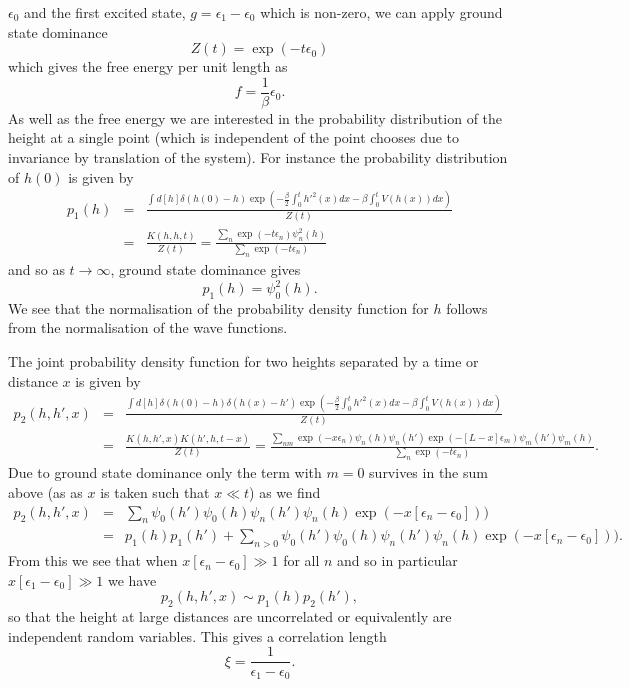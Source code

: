 $\epsilon_0$ and the first excited state, $g=\epsilon_1-\epsilon_0$ which is non-zero, we can apply ground state dominance 
\begin{equation}
Z(t) =\exp(-t\epsilon_0)
\end{equation}
which gives the free energy per unit length as
\begin{equation}
f=\frac{1}{\beta}\epsilon_0.
\end{equation}
As well as the free energy we are interested in the probability distribution of the height at a single point (which is independent of the point chooses due to invariance by translation of the system). For instance the probability distribution of $h(0)$ is given by
\begin{eqnarray}
p_1(h)&=& \frac{\int d[h]\delta(h(0)-h)\exp\left(-\frac{\beta}{2}\int_0^t h'^2(x) dx -\beta\int_0^t  V(h(x)) dx\right)}{Z(t)}\\
&=& \frac{K(h,h,t)}{Z(t)}=\frac{\sum_n \exp(-t\epsilon_n)\psi_n^2(h)}{\sum_n \exp(-t\epsilon_n)}
\end{eqnarray}
and so as $t\to\infty$, ground state dominance gives
\begin{equation}
p_1(h)= \psi_0^2(h).
\end{equation}
We see that the normalisation of the probability density function for $h$ follows from the 
normalisation of the wave functions.

The joint probability density function for two heights separated by a time or distance $x$ is given by
\begin{eqnarray}
p_2(h,h',x)&=& \frac{\int d[h]\delta(h(0)-h)\delta(h(x)-h')\exp\left(-\frac{\beta}{2}\int_0^t h'^2(x) dx -\beta\int_0^t  V(h(x)) dx\right)}{Z(t)}\\
&=& \frac{K(h,h',x)K(h',h,t-x)}{Z(t)} = \frac{\sum_{nm} \exp(-x\epsilon_n)\psi_n(h)\psi_n(h')\exp(-[L-x]\epsilon_m)\psi_m(h')\psi_m(h)}{\sum_n \exp(-t\epsilon_n)}.
\end{eqnarray}
Due to ground state dominance only the term with $m=0$ survives in the sum above (as
as $x$ is taken such that $x\ll t$) as we find
\begin{eqnarray}
p_2(h,h',x) &=& \sum_{n} \psi_0(h')\psi_0(h)\psi_n(h')\psi_n(h)\exp(-x[\epsilon_n-\epsilon_0]))\\
&=& p_1(h)p_1(h') + \sum_{n>0} \psi_0(h')\psi_0(h)\psi_n(h')\psi_n(h)\exp(-x[\epsilon_n-\epsilon_0])).\label{eqp2}
\end{eqnarray}
From this we see that when $x[\epsilon_n-\epsilon_0] \gg1 $ for all $n$ and so in particular $x[\epsilon_1-\epsilon_0] \gg1$ we have 
\begin{equation}
p_2(h,h',x) \sim p_1(h)p_2(h'),
\end{equation}
so that the height at large distances are uncorrelated or equivalently are independent random variables. This gives a correlation length
\begin{equation}
\xi = \frac{1}{\epsilon_1-\epsilon_0}.\label{clq}
\end{equation}

